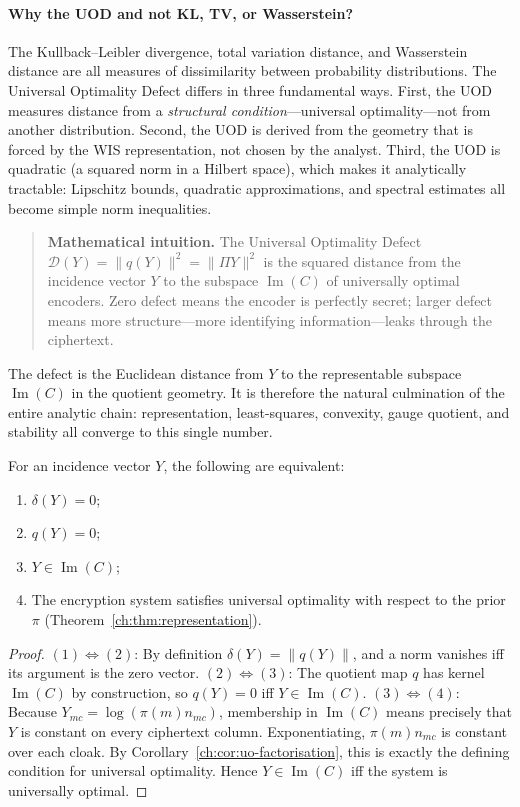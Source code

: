 \paragraph{Why the UOD and not KL, TV, or Wasserstein?}
The Kullback--Leibler divergence, total variation distance, and Wasserstein distance are all measures of dissimilarity between probability distributions.  The Universal Optimality Defect differs in three fundamental ways.  First, the UOD measures distance from a \emph{structural condition}---universal optimality---not from another distribution.  Second, the UOD is derived from the geometry that is forced by the WIS representation, not chosen by the analyst.  Third, the UOD is quadratic (a squared norm in a Hilbert space), which makes it analytically tractable: Lipschitz bounds, quadratic approximations, and spectral estimates all become simple norm inequalities.

\begin{quote}
\textbf{Mathematical intuition.}
The Universal Optimality Defect $\mathcal D(Y)=\|q(Y)\|^2=\|\Pi Y\|^2$ is the squared distance from the incidence vector $Y$ to the subspace $\operatorname{Im}(C)$ of universally optimal encoders.
Zero defect means the encoder is perfectly secret; larger defect means more structure---more identifying information---leaks through the ciphertext.
\end{quote}

The defect is the Euclidean distance from $Y$ to the representable subspace $\operatorname{Im}(C)$ in the quotient geometry.  It is therefore the natural culmination of the entire analytic chain: representation, least-squares, convexity, gauge quotient, and stability all converge to this single number.
\begin{theorem}\label{ch:thm:defect-characterisation}
For an incidence vector $Y$, the following are equivalent:
\begin{enumerate}
\item $\delta(Y)=0$;
\item $q(Y)=0$;
\item $Y\in\operatorname{Im}(C)$;
\item The encryption system satisfies universal optimality with respect to the prior $\pi$ (Theorem~\ref{ch:thm:representation}).
\end{enumerate}
\end{theorem}
\begin{proof}
$(1)\Leftrightarrow(2)$: By definition $\delta(Y)=\|q(Y)\|$, and a norm vanishes iff its argument is the zero vector.
$(2)\Leftrightarrow(3)$: The quotient map $q$ has kernel $\operatorname{Im}(C)$ by construction, so $q(Y)=0$ iff $Y\in\operatorname{Im}(C)$.
$(3)\Leftrightarrow(4)$: Because $Y_{mc}=\log(\pi(m)n_{mc})$, membership in $\operatorname{Im}(C)$ means precisely that $Y$ is constant on every ciphertext column.  Exponentiating, $\pi(m)n_{mc}$ is constant over each cloak.  By Corollary~\ref{ch:cor:uo-factorisation}, this is exactly the defining condition for universal optimality.  Hence $Y\in\operatorname{Im}(C)$ iff the system is universally optimal.
\end{proof}
